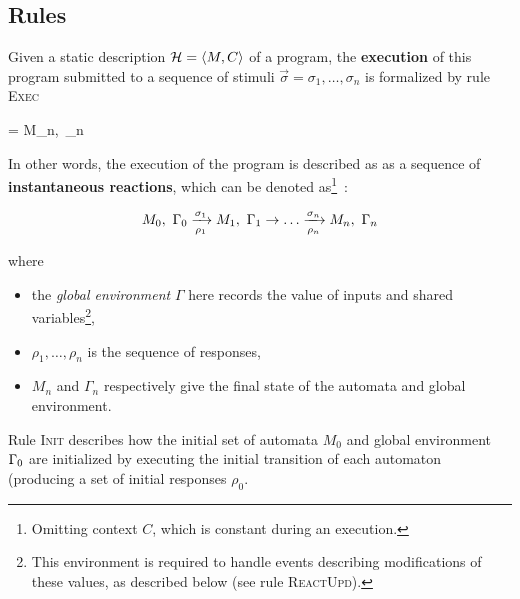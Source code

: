 

\subsection*{Rules}
\label{sec:dynsem-rules}

\step
Given a static description $\mathcal{H}=\langle M, C\rangle$ of a program, the \textbf{execution} of this
program submitted to a sequence of stimuli $\vec{\sigma}=\sigma_1,\ldots,\sigma_n$ is formalized by
rule \textsc{Exec} 


{= \xrightarrow[\vec{\rho}=\sequn{\rho}]{\vec{\sigma}=\sequn{\sigma}} M_n,\ \env_n}

In other words, the execution of the program is described as as a sequence of \textbf{instantaneous
reactions}, which can be denoted as\footnote{Omitting context $C$, which is constant during an
execution.}~:

\begin{eqnarray*}
  M_0,\ \Gamma_0 \xrightarrow[\rho_1]{\sigma_1} M_1,\ \Gamma_1 \rightarrow \ldots
  \xrightarrow[\rho_n]{\sigma_n} M_n,\ \Gamma_n
\end{eqnarray*}

\noindent where
\begin{itemize}
\item the \emph{global environment} $\Gamma$ here records the value of inputs and shared
  variables\footnote{This environment is required to handle events describing modifications of these
    values, as described below (see rule \textsc{ReactUpd}).},
\item $\rho_1, \ldots, \rho_n$ is the sequence of responses,
  \item $M_n$ and $\Gamma_n$ respectively give the final state of the automata and global
    environment.
\end{itemize}
  
\medskip \step
Rule \textsc{Init} describes how the initial set of automata $M_0$ and global environment
$\Gamma_0$ are initialized by executing the initial transition of each automaton (producing a set of
initial responses $\rho_0$. 

